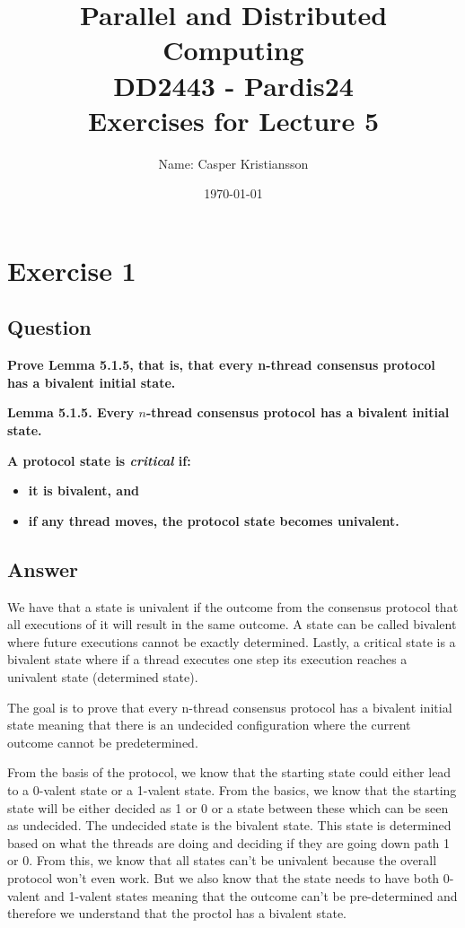 \documentclass{article}
\title{\textbf{Parallel and Distributed Computing\\DD2443 - Pardis24\\Exercises for Lecture 5}}
\author{Name: Casper Kristiansson}
\date{\today}
\begin{document}
\setlength\parindent{0pt}
\setlength{\parskip}{\bigskipamount}

\maketitle

\section*{Exercise 1}
\subsection*{Question}
\textbf{Prove Lemma 5.1.5, that is, that every n-thread consensus protocol has a bivalent initial state.}

\textbf{Lemma 5.1.5. Every $n$-thread consensus protocol has a bivalent initial state.}

\textbf{A protocol state is \emph{critical} if:}
\begin{itemize}
    \item \textbf{it is bivalent, and}
    \item \textbf{if any thread moves, the protocol state becomes univalent.}
\end{itemize}

\subsection*{Answer}
We have that a state is univalent if the outcome from the consensus protocol that all executions of it will result in the same outcome. A state can be called bivalent where future executions cannot be exactly determined. Lastly, a critical state is a bivalent state where if a thread executes one step its execution reaches a univalent state (determined state). 

The goal is to prove that every n-thread consensus protocol has a bivalent initial state meaning that there is an undecided configuration where the current outcome cannot be predetermined. 

From the basis of the protocol, we know that the starting state could either lead to a 0-valent state or a 1-valent state. From the basics, we know that the starting state will be either decided as 1 or 0 or a state between these which can be seen as undecided. The undecided state is the bivalent state. This state is determined based on what the threads are doing and deciding if they are going down path 1 or 0. From this, we know that all states can't be univalent because the overall protocol won't even work. But we also know that the state needs to have both 0-valent and 1-valent states meaning that the outcome can't be pre-determined and therefore we understand that the proctol has a bivalent state.
\end{document}
